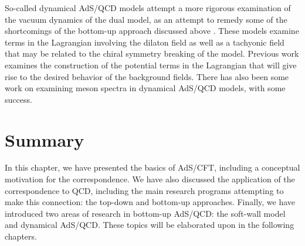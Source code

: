 So-called dynamical AdS/QCD models attempt a more rigorous examination of the vacuum dynamics of the dual model, as an attempt to remedy some of the shortcomings of the bottom-up approach discussed above \cite{Batell2008,Li:2013xpa,Li2013,DePaula2009,DePaula2010,Wang2012,Li2013a}. 
These models examine terms in the Lagrangian involving the dilaton field as well as a tachyonic field that may be related to the chiral symmetry breaking of the model.
Previous work examines the construction of the potential terms in the Lagrangian that will give rise to the desired behavior of the background fields.
There has also been some work on examining meson spectra in dynamical AdS/QCD models, with some success.

\section{Summary}
In this chapter, we have presented the basics of AdS/CFT, including a conceptual motivation for the correspondence.
We have also discussed the application of the correspondence to QCD, including the main research programs attempting to make this connection: the top-down and bottom-up approaches. 
Finally, we have introduced two areas of research in bottom-up AdS/QCD: the soft-wall model and dynamical AdS/QCD. 
These topics will be elaborated upon in the following chapters.

